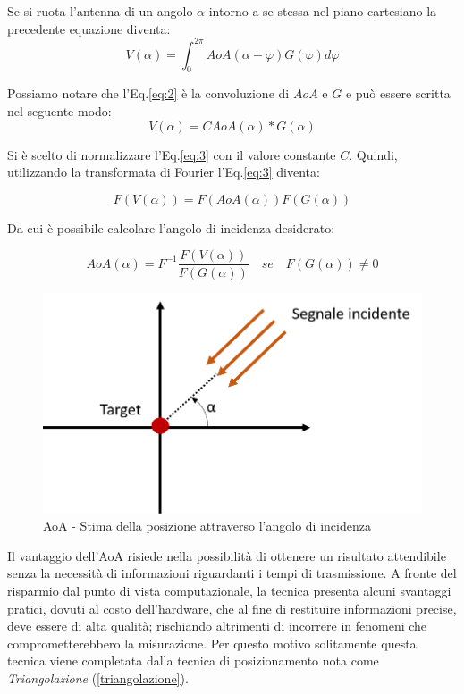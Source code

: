 Se si ruota l'antenna di un angolo $\alpha$ intorno a se stessa nel piano cartesiano la precedente equazione diventa:
\begin{equation}
\label{eq:2}
V (\alpha) = \int_{0}^{2\pi} AoA(\alpha-\varphi) G(\varphi)d\varphi 
\end{equation}

Possiamo notare che l'Eq.\ref{eq:2} è la convoluzione di $AoA$ e $G$ e può essere scritta nel seguente modo:
\begin{equation}
\label{eq:3}
V (\alpha) = C AoA(\alpha) * G(\alpha)
\end{equation}

Si è scelto di normalizzare l'Eq.\ref{eq:3} con il valore constante $C$. Quindi, utilizzando la transformata di Fourier l'Eq.\ref{eq:3} diventa:

\begin{equation}
\label{eq:4}
F(V(\alpha)) = F(AoA(\alpha)) F(G(\alpha))
\end{equation}

Da cui è possibile calcolare l'angolo di incidenza desiderato:

\begin{equation}
\label{eq:5}
AoA(\alpha) = F^{-1} \dfrac{F(V(\alpha))}{F(G(\alpha))} \quad se \quad F(G(\alpha))\neq 0
\end{equation}

\begin{figure}[H]  
	\centering 
	\includegraphics[scale=0.4]{ContestoApplicativo/aoa.png}
	\caption{AoA - Stima della posizione attraverso l'angolo di incidenza}
	\label{fig:aoa}
\end{figure}

Il vantaggio dell’AoA risiede nella possibilità di ottenere un risultato attendibile senza la necessità di informazioni riguardanti i tempi di trasmissione. A fronte del risparmio dal punto di vista computazionale, la tecnica presenta alcuni svantaggi pratici, dovuti al costo dell’hardware, che al fine di restituire informazioni precise, deve essere di alta qualità; rischiando altrimenti di incorrere in fenomeni che comprometterebbero la misurazione. Per questo motivo solitamente questa tecnica viene completata dalla tecnica di posizionamento nota come \textit{Triangolazione} (\ref{triangolazione}).


